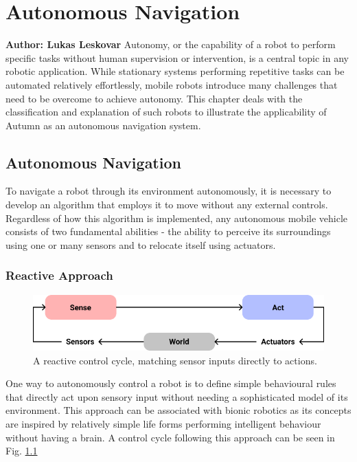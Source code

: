 \chapter{Autonomous Navigation}

\textbf{Author: Lukas Leskovar} 
Autonomy, or the capability of a robot to perform specific tasks without human supervision or intervention, is a central topic in any robotic application.
While stationary systems performing repetitive tasks can be automated relatively effortlessly, mobile robots introduce many challenges that need to be overcome to achieve autonomy.
This chapter deals with the classification and explanation of such robots to illustrate the applicability of Autumn as an autonomous navigation system.

\section{Autonomous Navigation}
To navigate a robot through its environment autonomously, it is necessary to develop an algorithm that employs it to move without any external controls. Regardless of how this algorithm is implemented, any autonomous mobile vehicle consists of two fundamental abilities - the ability to perceive its surroundings using one or many sensors and to relocate itself using actuators. 

\subsection{Reactive Approach}

\begin{figure}
	\centering
	\includegraphics[width=0.9\linewidth]{img/reactive}
	\caption{
		A reactive control cycle, matching sensor inputs directly to actions.
	}
	\label{fig:reactiveApproach}
\end{figure}

One way to autonomously control a robot is to define simple behavioural rules that directly act upon sensory input without needing a sophisticated model of its environment. 
This approach can be associated with bionic robotics as its concepts are inspired by relatively simple life forms performing intelligent behaviour without having a brain. 
A control cycle following this approach can be seen in Fig. \ref{fig:reactiveApproach}

